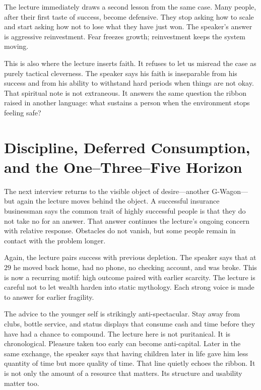 The lecture immediately draws a second lesson from the same case. Many people, after their first taste of success, become defensive. They stop asking how to scale and start asking how not to lose what they have just won. The speaker's answer is aggressive reinvestment. Fear freezes growth; reinvestment keeps the system moving.

This is also where the lecture inserts faith. It refuses to let us misread the case as purely tactical cleverness. The speaker says his faith is inseparable from his success and from his ability to withstand hard periods when things are not okay. That spiritual note is not extraneous. It answers the same question the ribbon raised in another language: what sustains a person when the environment stops feeling safe?

\section{Discipline, Deferred Consumption, and the One--Three--Five Horizon}

The next interview returns to the visible object of desire---another G-Wagon---but again the lecture moves behind the object. A successful insurance businessman says the common trait of highly successful people is that they do not take no for an answer. That answer continues the lecture's ongoing concern with relative response. Obstacles do not vanish, but some people remain in contact with the problem longer.

Again, the lecture pairs success with previous depletion. The speaker says that at \(29\) he moved back home, had no phone, no checking account, and was broke. This is now a recurring motif: high outcome paired with earlier scarcity. The lecture is careful not to let wealth harden into static mythology. Each strong voice is made to answer for earlier fragility.

The advice to the younger self is strikingly anti-spectacular. Stay away from clubs, bottle service, and status displays that consume cash and time before they have had a chance to compound. The lecture here is not puritanical. It is chronological. Pleasure taken too early can become anti-capital. Later in the same exchange, the speaker says that having children later in life gave him less quantity of time but more quality of time. That line quietly echoes the ribbon. It is not only the amount of a resource that matters. Its structure and usability matter too.

